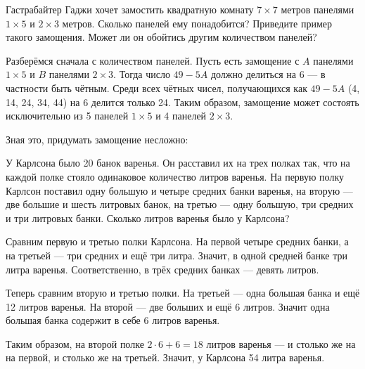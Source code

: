 

\begin{itemize}

\itB Гастрабайтер Гаджи хочет замостить квадратную комнату $7 \times 7$ метров панелями $1 \times 5$ и $2 \times 3$ метров. Сколько панелей ему понадобится? Приведите пример такого замощения. Может ли он обойтись другим количеством панелей?

\itr Разберёмся сначала с количеством панелей. Пусть есть замощение с $A$ панелями $1 \times 5$ и $B$ панелями $2 \times 3$. Тогда число $49 - 5A$ должно делиться на 6 — в частности быть чётным. Среди всех чётных чисел, получающихся как $49 - 5A$ (4, 14, 24, 34, 44) на 6 делится только 24. Таким образом, замощение может состоять исключительно из 5 панелей $1 \times 5$ и 4 панелей $2 \times 3$.

Зная это, придумать замощение несложно:

	\medskip
	\begin{center}  \end{center}

\itC У Карлсона было 20 банок варенья. Он расставил их на трех полках так, что на каждой полке стояло одинаковое количество литров варенья. На первую полку Карлсон поставил одну большую и четыре средних банки варенья, на вторую — две большие и шесть литровых банок, на третью — одну большую, три средних и три литровых банки. Сколько литров варенья было у Карлсона?

\itr Сравним первую и третью полки Карлсона. На первой четыре средних банки, а на третьей — три средних и ещё три литра. Значит, в одной средней банке три литра варенья. Соответственно, в трёх средних банках — девять литров.

Теперь сравним вторую и третью полки. На третьей — одна большая банка и ещё 12 литров варенья. На второй — две больших и ещё 6 литров. Значит одна большая банка содержит в себе 6 литров варенья.

Таким образом, на второй полке $2 \cdot 6 + 6 = 18$ литров варенья — и столько же на на первой, и столько же на третьей. Значит, у Карлсона 54 литра варенья.
\bigbreak\noindent

\end{itemize}

